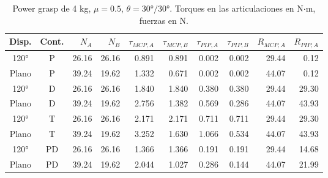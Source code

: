 \begin{table}[H]
\centering
\small
\begin{adjustbox}{max width=\textwidth}
\begin{tabular}{|c|c|r|r|r|r|r|r|r|r|}
\hline
\textbf{Disp.} & \textbf{Cont.} & \textbf{$N_A$} & \textbf{$N_B$} & \textbf{$\tau_{MCP,A}$} & \textbf{$\tau_{MCP,B}$} & \textbf{$\tau_{PIP,A}$} & \textbf{$\tau_{PIP,B}$} & \textbf{$R_{MCP,A}$} & \textbf{$R_{PIP,A}$} \\ \hline
120° & P & 26.16 & 26.16 & 0.891 & 0.891 & 0.002 & 0.002 & 29.44 & 0.12 \\ \hline
Plano & P & 39.24 & 19.62 & 1.332 & 0.671 & 0.002 & 0.002 & 44.07 & 0.12 \\ \hline
120° & D & 26.16 & 26.16 & 1.840 & 1.840 & 0.380 & 0.380 & 29.44 & 29.30 \\ \hline
Plano & D & 39.24 & 19.62 & 2.756 & 1.382 & 0.569 & 0.286 & 44.07 & 43.93 \\ \hline
120° & T & 26.16 & 26.16 & 2.171 & 2.171 & 0.711 & 0.711 & 29.44 & 29.30 \\ \hline
Plano & T & 39.24 & 19.62 & 3.252 & 1.630 & 1.066 & 0.534 & 44.07 & 43.93 \\ \hline
120° & PD & 26.16 & 26.16 & 1.366 & 1.366 & 0.191 & 0.191 & 29.44 & 14.68 \\ \hline
Plano & PD & 39.24 & 19.62 & 2.044 & 1.027 & 0.286 & 0.144 & 44.07 & 21.99 \\ \hline
\end{tabular}
\end{adjustbox}
\caption{Power grasp de 4 kg, $\mu=0.5$, $\theta = 30°/30°$. Torques en las articulaciones en N$\cdot$m, fuerzas en N.}
\label{tab:power}
\end{table}
